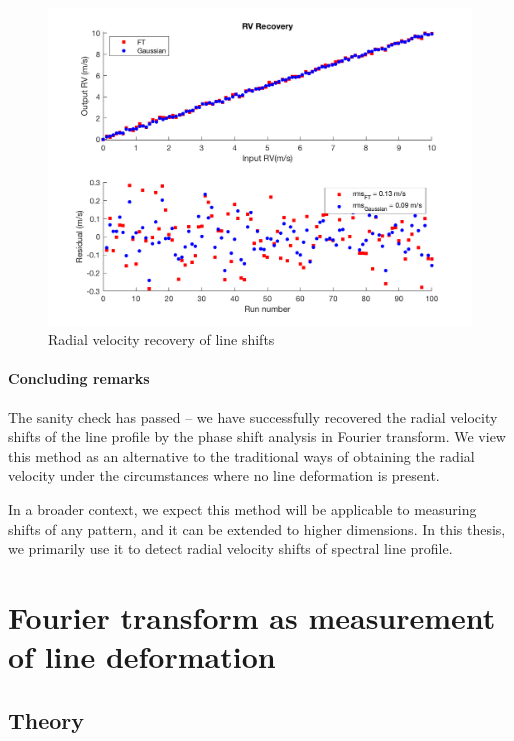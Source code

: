 \begin{figure}[htbp]
\centering
\includegraphics[width = 0.8 \linewidth]
{./Figures/Methods/5-LINE_SHIFT_ONLY.png}
\caption[Radial velocity recovery]
{Radial velocity recovery of line shifts}
\label{fig:rv_recovery}
\end{figure} 

\paragraph{Concluding remarks}
The sanity check has passed -- we have successfully recovered the radial velocity shifts of the line profile 
by the phase shift analysis in Fourier transform. We view this method as an alternative to the traditional 
ways of obtaining the radial velocity under the circumstances where no line deformation is present. 

In a broader context, we expect this method will be applicable to measuring shifts of any pattern, and it 
can be extended to higher dimensions. In this thesis, we primarily use it to detect radial velocity shifts 
of spectral line profile. 


\section{Fourier transform as measurement of line deformation}
\label{\thesection}
\label{sec:FT_ld}


\subsection{Theory}
\label{sec:LD_Theory}

